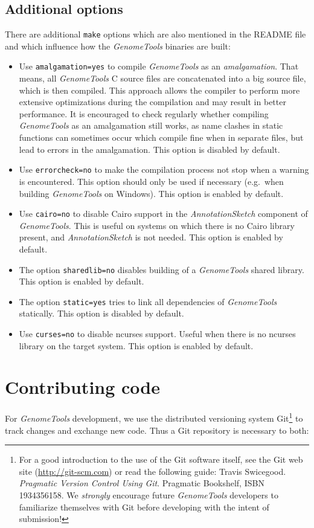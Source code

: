 \documentclass[11pt,final]{article}
\newcommand{\keyword}[1]{\lstinline{#1}}
\newcommand{\Gt}[0]{\emph{GenomeTools}\xspace}
\begin{document}
\subsection{Additional options}
There are additional \keyword{make} options which are also mentioned in the
README file and which influence how the \Gt binaries are built:
\begin{itemize}
\item
Use \keyword{amalgamation=yes} to compile \Gt as an \emph{amalgamation}. That
means, all \Gt C source files are concatenated into a big source file, which is
then compiled. This approach allows the compiler to perform more extensive
optimizations during the compilation and may result in better performance.
It is encouraged to check regularly whether compiling \Gt as an amalgamation
still works, as name clashes in static functions can sometimes occur which
compile fine when in separate files, but lead to errors in the amalgamation.
This option is disabled by default.
\item
Use \keyword{errorcheck=no} to make the compilation process not stop when a
warning is encountered. This option should only be used if necessary (e.g.\ when
building \Gt on Windows). This option is enabled by default.
\item
Use \keyword{cairo=no} to disable Cairo support in the \emph{AnnotationSketch}
component of \Gt . This is useful on systems on which there is no Cairo library
present, and \emph{AnnotationSketch} is not needed. This option is enabled by
default.
\item
The option \keyword{sharedlib=no} disables building of a \Gt shared library.
This option is enabled by default.
\item
The option \keyword{static=yes} tries to link all dependencies of \Gt
statically. This option is disabled by default.
\item
Use \keyword{curses=no} to disable ncurses support. Useful when there is no
ncurses library on the target system. This option is enabled by default.
\end{itemize}

\section{Contributing code}

For \Gt development, we use the distributed versioning system Git\footnote{For
a good introduction to the use of the Git software itself, see the Git web site
(\url{http://git-scm.com}) or read the following guide:
Travis Swicegood. \emph{Pragmatic Version Control Using Git}.
Pragmatic Bookshelf, ISBN 1934356158. We \emph{strongly} encourage future \Gt
developers to familiarize themselves with Git before developing with the intent
of submission!} to track changes and
exchange new code. Thus a Git repository is necessary to both:
\end{document}
